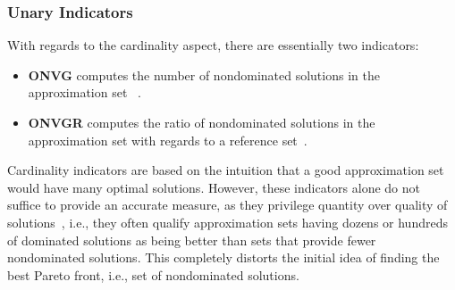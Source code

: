 	
	\subsubsection{Unary Indicators}
	With regards to the cardinality aspect, there are essentially two indicators:
	\begin{itemize}
		\item \textbf{\ac{ONVG}} computes the number of nondominated solutions in the approximation set ~\cite{Veldhuizen1999GD}.
		\item \textbf{\ac{ONVGR}} computes the ratio of nondominated solutions in the approximation set with regards to a reference set~\cite{Veldhuizen1999GD}.
	\end{itemize}
	
	Cardinality indicators are based on the intuition that a good approximation set would have many optimal solutions. However, these indicators alone do not suffice to provide an accurate measure, as they privilege quantity over quality of solutions~\cite{Veldhuizen1999GD}, i.e., they often qualify approximation sets having dozens or hundreds of dominated solutions as being better than sets that provide fewer nondominated solutions. This completely distorts the initial idea of finding the best Pareto front, i.e., set of nondominated solutions.
	
